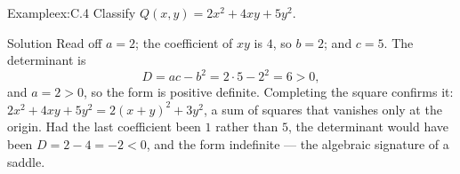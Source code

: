 \documentclass[a4paper,12pt,oneside]{memoir}
\begin{document}
\begin{workedexample}
\begin{envexample}{Example}{ex:C.4}{}
Classify \(Q(x, y) = 2x^2 + 4xy + 5y^2\).
\end{envexample}
\begin{envsolution}{Solution}{}{}
Read off \(a = 2\); the coefficient of \(xy\) is \(4\), so \(b = 2\); and \(c = 5\). The determinant is \[ D = ac - b^2 = 2\cdot 5 - 2^2 = 6 > 0, \] and \(a = 2 > 0\), so the form is positive definite. Completing the square confirms it: \(2x^2 + 4xy + 5y^2 = 2(x + y)^2 + 3y^2\), a sum of squares that vanishes only at the origin. Had the last coefficient been \(1\) rather than \(5\), the determinant would have been \(D = 2 - 4 = -2 < 0\), and the form indefinite — the algebraic signature of a saddle.
\end{envsolution}
\end{workedexample}
\end{document}
